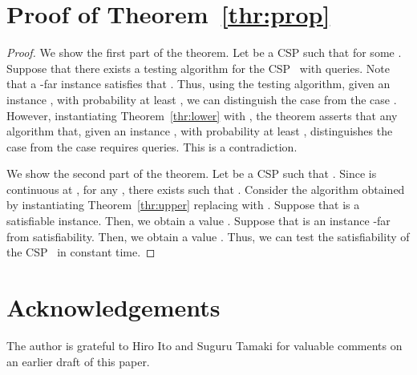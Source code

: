 \documentclass[letterpaper, 11pt]{article}
\begin{document}
\section{Proof of Theorem~\ref{thr:prop}}\label{apx:prop}
\begin{proof}
  We show the first part of the theorem.
  Let  be a CSP such that  for some .
  Suppose that there exists a testing algorithm for the CSP~ with  queries.
  Note that a -far instance  satisfies that .
  Thus, using the testing algorithm, given an instance , 
  with probability at least ,
  we can distinguish the case  from the case .
  However, instantiating Theorem~\ref{thr:lower} with ,
  the theorem asserts that
  any algorithm that, given an instance , 
  with probability at least ,
  distinguishes the case  from the case  requires  queries.
  This is a contradiction.
  
  We show the second part of the theorem.
  Let  be a CSP such that .
  Since  is continuous at ,
  for any , there exists  such that 
  .
  Consider the algorithm obtained by instantiating Theorem~\ref{thr:upper} replacing  with .
  Suppose that  is a satisfiable instance.
  Then, we obtain a value .
  Suppose that  is an instance -far from satisfiability.
  Then, we obtain a value .
  Thus, we can test the satisfiability of the CSP~ in constant time.
\end{proof}


\section*{Acknowledgements}
The author is grateful to Hiro Ito and Suguru Tamaki for valuable comments on an earlier draft of this paper.
\end{document}
